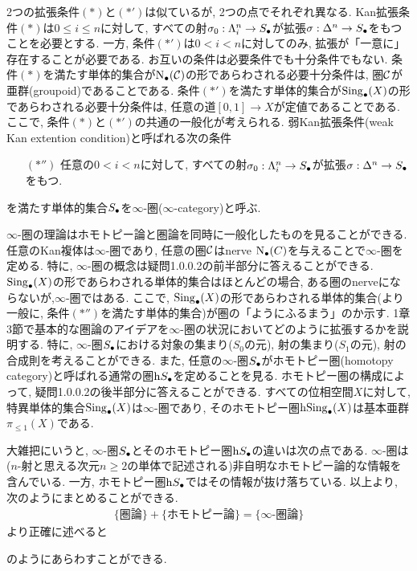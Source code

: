 \documentclass[uplatex, a4paper, 14Q, dvipdfmx]{jsreport}
\begin{document}
2つの拡張条件$(\ast)$と$(\ast')$は似ているが, 2つの点でそれぞれ異なる.
Kan拡張条件$(\ast)$は$0 \leq i \leq n$に対して, すべての射$\si_0: \Lambda^n_i \to \S$が拡張$\si: \Delta^n \to \S$をもつことを必要とする. 
一方, 条件$(\ast')$は$0 < i < n$に対してのみ, 拡張が「一意に」存在することが必要である. 
お互いの条件は必要条件でも十分条件でもない. 
条件$(\ast)$を満たす単体的集合が$\N(\calC)$の形であらわされる必要十分条件は, 圏$\calC$が亜群(groupoid)であることである. 
条件$(\ast')$を満たす単体的集合が$\Sing_\bullet(X)$の形であらわされる必要十分条件は, 任意の道$[0,1] \to X$が定値であることである. 
ここで, 条件$(\ast)$と$(\ast')$の共通の一般化が考えられる. 
弱Kan拡張条件(weak Kan extention condition)と呼ばれる次の条件
\begin{itemize}
  \item[$(\ast'')$] 任意の$0 < i < n$に対して, すべての射$\si_0: \Lambda^n_i \to \S$が拡張$\si: \Delta^n \to \S$をもつ. 
\end{itemize}
を満たす単体的集合$\S$を$\infty$-圏($\infty$-category)と呼ぶ. 

$\infty$-圏の理論はホモトピー論と圏論を同時に一般化したものを見ることができる. 
任意のKan複体は$\infty$-圏であり, 任意の圏$\calC$はnerve $\N(C)$を与えることで$\infty$-圏を定める. 
特に, $\infty$-圏の概念は疑問1.0.0.2の前半部分に答えることができる.
$\Sing_\bullet(X)$の形であらわされる単体的集合はほとんどの場合, ある圏のnerveにならないが,$\infty$-圏ではある. %
ここで, $\Sing_\bullet(X)$の形であらわされる単体的集合(より一般に, 条件$(\ast'')$を満たす単体的集合)が圏の「ようにふるまう」のか示す. 
1章3節で基本的な圏論のアイデアを$\infty$-圏の状況においてどのように拡張するかを説明する. 
特に, $\infty$-圏$\S$における対象の集まり($S_0$の元), 射の集まり($S_1$の元), 射の合成則を考えることができる. 
また, 任意の$\infty$-圏$\S$がホモトピー圏(homotopy category)と呼ばれる通常の圏$\h \S$を定めることを見る. 
ホモトピー圏の構成によって, 疑問1.0.0.2の後半部分に答えることができる. 
すべての位相空間$X$に対して, 特異単体的集合$\Sing_\bullet(X)$は$\infty$-圏であり, そのホモトピー圏$\h{\Sing_\bullet(X)}$は基本亜群$\pi_{\leq 1}(X)$である. 

大雑把にいうと, $\infty$-圏$\S$とそのホモトピー圏$\h \S$の違いは次の点である. 
$\infty$-圏は($n$-射と思える次元$n \geq 2$の単体で記述される)非自明なホモトピー論的な情報を含んでいる. 
一方, ホモトピー圏$\h \S$ではその情報が抜け落ちている. 
以上より, 次のようにまとめることができる. 
\begin{align*}
  \{\text{圏論}\} + \{\text{ホモトピー論}\} = \{\infty\text{-圏論}\}
\end{align*}
より正確に述べると 
\begin{center}
\end{center}
のようにあらわすことができる. 
\end{document}
